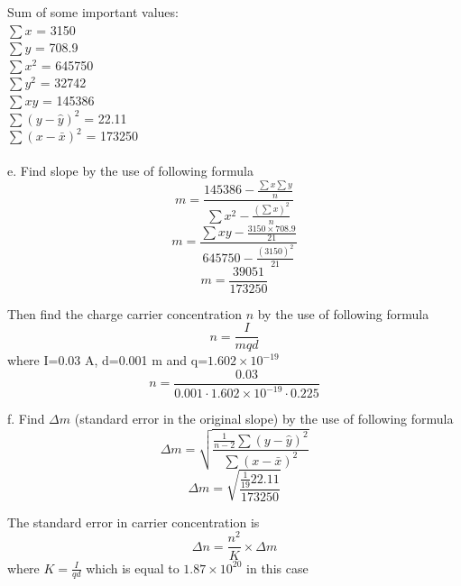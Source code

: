 \documentclass[a4paper,12pt]{article}
\begin{document}
\newpage
Sum of some important values:\\
$\sum x$ = 3150\\
$\sum y$ = 708.9\\
$\sum x^{2}$ = 645750\\
$\sum y^{2}$ = 32742\\
$\sum xy$ = 145386\\
$\sum (y-\hat{y})^{2}$ = 22.11\\
$\sum (x-\bar{x})^{2}$ = 173250\\\\
e. Find slope by the use of following formula
\begin{equation}
m=\frac{145386 - \frac{\sum x \sum y}{n}}{\sum x^{2} - \frac{(\sum x )^{2}}{n}}
\end{equation}
\begin{equation}
m=\frac{\sum xy - \frac{3150 \times 708.9}{21}}{645750 - \frac{(3150)^{2}}{21}}
\end{equation}
\begin{equation}
m=\frac{39051}{173250}
\end{equation}
\begin{center}
\end{center}
Then find the charge carrier concentration $n$ by the use of following formula
\begin{equation}
n=\frac{I}{mqd}
\end{equation}
where I=0.03 A, d=0.001 m and q=$1.602\times10^{-19}$
\begin{equation}
n=\frac{0.03}{0.001 \cdot 1.602\times 10^{-19} \cdot 0.225}
\end{equation}
\begin{center}
\end{center}
f. Find $\Delta m$ (standard error in the original slope) by the use of following formula
\begin{equation}
\Delta m = \sqrt{\frac{\frac{1}{n-2}\sum (y-\hat{y})^{2}}{\sum (x-\bar{x})^{2}}}
\end{equation}
\begin{equation}
\Delta m = \sqrt{\frac{\frac{1}{19}22.11}{173250}}
\end{equation}
\begin{center}
\end{center}
The standard error in carrier concentration is
\begin{equation}
\Delta n = \frac{n^{2}}{K}\times\Delta m
\end{equation}
\newpage
where $K= \frac{I}{qd}$ which is equal to $1.87\times10^{20}$ in this case
\end{document}

